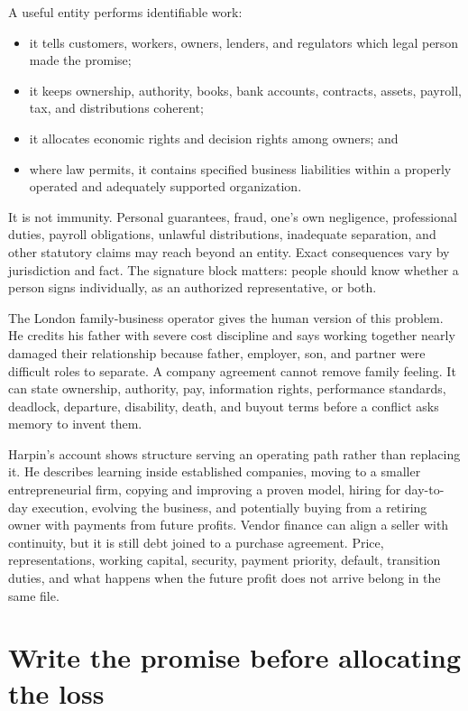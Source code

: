 A useful entity performs identifiable work:

\begin{itemize}[itemsep=0.13em]
\item it tells customers, workers, owners, lenders, and regulators which legal
  person made the promise;
\item it keeps ownership, authority, books, bank accounts, contracts, assets,
  payroll, tax, and distributions coherent;
\item it allocates economic rights and decision rights among owners; and
\item where law permits, it contains specified business liabilities within a
  properly operated and adequately supported organization.
\end{itemize}

It is not immunity. Personal guarantees, fraud, one's own negligence,
professional duties, payroll obligations, unlawful distributions, inadequate
separation, and other statutory claims may reach beyond an entity. Exact
consequences vary by jurisdiction and fact. The signature block matters:
people should know whether a person signs individually, as an authorized
representative, or both.

The London family-business operator gives the human version of this problem.
He credits his father with severe cost discipline and says working together
nearly damaged their relationship because father, employer, son, and partner
were difficult roles to separate. A company agreement cannot remove family
feeling. It can state ownership, authority, pay, information rights,
performance standards, deadlock, departure, disability, death, and buyout
terms before a conflict asks memory to invent them.

Harpin's account shows structure serving an operating path rather than
replacing it. He describes learning inside established companies, moving to a
smaller entrepreneurial firm, copying and improving a proven model, hiring for
day-to-day execution, evolving the business, and potentially buying from a
retiring owner with payments from future profits. Vendor finance can align a
seller with continuity, but it is still debt joined to a purchase agreement.
Price, representations, working capital, security, payment priority, default,
transition duties, and what happens when the future profit does not arrive
belong in the same file.

\section{Write the promise before allocating the loss}

